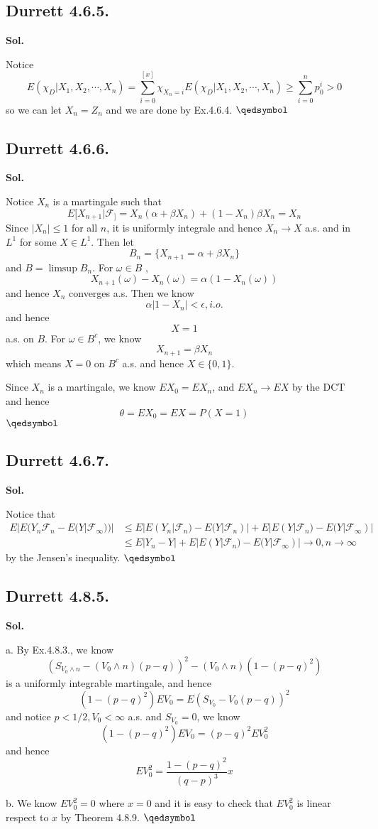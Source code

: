 \documentclass[lang=en,11pt,a4paper,citestyle =authoryear]{elegantpaper}
\newcommand{\prvd}{$\hfill \qedsymbol$}
\newcommand{\F}{\mathcal{F}}
\begin{document}
\subsection*{Durrett 4.6.5.}
\textbf{Sol.} \par
Notice
\[E(\chi_D|X_1,X_2,\cdots,X_n) = \sum\limits_{i=0}^{[x]} \chi_{X_n = i}E(\chi_D|X_1,X_2,\cdots,X_n) \geq \sum\limits_{i=0}^n p_0^i > 0\]
so we can let $X_n = Z_n$ and we are done by Ex.4.6.4.
\prvd
\vspace{0.5em}

\subsection*{Durrett 4.6.6.} 
\textbf{Sol.} \par
Notice $X_n$ is a martingale such that
\[E[X_{n+1}|\F_] = X_n(\alpha +\beta X_n)+(1-X_n)\beta X_n = X_n\]
Since $|X_n| \leq 1$ for all $n$, it is uniformly integrale and hence $X_n\to X$ a.s. and in $L^1$ for some $X\in L^1$. Then let
\[B_n = \{X_{n+1} = \alpha+\beta X_n\}\] and $B= \limsup B_n$. For $\omega \in B$ ,
\[X_{n+1}(\omega) -X_n(\omega) = \alpha(1-X_{n}(\omega))\]
and hence $X_n$ converges a.s. Then we know
\[\alpha|1-X_n| < \epsilon, i.o.\]
and hence
\[X = 1\] a.s. on $B$. For $\omega \in B^c$, we know
\[X_{n+1} = \beta X_n\]
which means $X = 0$ on $B^c$ a.s. and hence $X\in\{0,1\}$.\par
Since $X_n$ is a martingale, we know $EX_0 = EX_n$, and $EX_n \to EX$ by the DCT and hence
\[\theta = EX_0 = EX = P(X=1)\]
\prvd
\vspace{0.5em}

\subsection*{Durrett 4.6.7.} 
\textbf{Sol.} \par
Notice that
\[
\begin{aligned}
E|E(Y_n\F_n-E(Y|\F_{\infty}))| &\leq E|E(Y_n|\F_n)- E(Y|\F_n)|+E|E(Y|\F_n) - E(Y|\F_{\infty})| \\
& \leq E|Y_n-Y|+E|E(Y|\F_n) - E(Y|\F_{\infty})| \to 0, n\to\infty
\end{aligned}
\]
by the Jensen's inequality.
\prvd
\vspace{0.5em}

\subsection*{Durrett 4.8.5.} 
\textbf{Sol.} \par
a. By Ex.4.8.3., we know
\[(S_{V_0\wedge n }-(V_0\wedge n)(p-q))^2 - (V_0\wedge n )(1-(p-q)^2)\]
is a uniformly integrable martingale, and hence
\[(1-(p-q)^2)EV_0 = E(S_{V_0} - V_0(p-q))^2\]
and notice $p<1/2, V_0 <\infty$ a.s. and $S_{V_0} = 0$, we know
\[(1-(p-q)^2)EV_0 = (p-q)^2 EV_0^2\]
and hence
\[EV_0^2 = \dfrac{1-(p-q)^2}{(q-p)^3}x\]\par
b. We know $EV_0^2 = 0$ where $x = 0$ and it is easy to check that $EV_0^2$ is linear respect to $x$ by Theorem 4.8.9.
\prvd
\vspace{0.5em}
\end{document}
